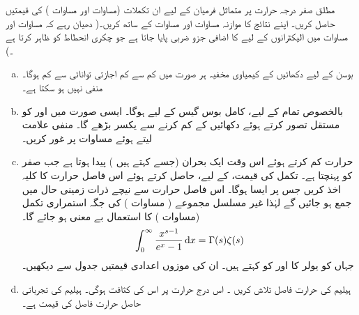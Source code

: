 مطلق صفر درجہ حرارت پر متماثل فرميان کے لیے   ان تکملات (مساوات    اور مساوات  )   کی قیمتیں حاصل کریں۔  اپنے نتائج کا موازنہ مساوات    اور مساوات     کے ساتھ کریں۔( دھیان رہے کہ مساوات     اور مساوات  میں الیکٹرانوں کے لیے  کا  اضافی جزو ضربی  پایا جاتا ہے جو چکری  انحطاط کو ظاہر کرتا ہے ۔)
\begin{enumerate}[a.]
\item
بوسن کے لیے دکھائیں کے کیمیاوی مخفیہ ہر صورت میں کم سے کم اجازتی توانائی سے کم ہوگا۔    منفی نہیں ہو سکتا ہے۔ 
\item
بالخصوص تمام  کے لیے،  کامل بوس گیس کے لیے  ہوگا۔  ایسی صورت میں  اور  کو مستقل تصور کرتے ہوئے دکھائیں کے  کم کرنے سے  یکسر بڑھے گا۔   منفی علامت لیتے ہوئے مساوات     پر غور کریں۔
\item
حرارت  کم کرتے ہوئے اس وقت ایک بحران (جسے    کہتے ہیں )  پیدا ہوتا ہے  جب  صفر کو پہنچتا ہے۔ تکمل کی قیمت،   کے لیے،  حاصل کرتے ہوئے اس فاصل حرارت   کا کلیہ اخذ کریں جس پر ایسا ہوگا۔  اس فاصل حرارت سے نیچے ذرات زمینی حال میں جمع ہو جائیں گے لہٰذا غیر مسلسل مجموعے (  مساوات  )   کی جگہ استمراری تکمل (مساوات  )   کا استعمال بے معنی ہو جائے گا۔  
\begin{align} 
\int_0^{\infty} \frac{x^{s - 1}}{e^x - 1} \dif x = \Gamma (s) \zeta(s)
\end{align} 
جہاں  کو  یولر  کا   اور  کو    کہتے ہیں۔ ان کی موزوں  اعدادی قیمتیں  جدول سے دیکھیں۔ 
\item
ہیلیم   کی حرارت فاصل تلاش کریں ۔ اس درج حرارت پر اس کی کثافت  ہوگی۔  ہیلیم کی تجرباتی حاصل حرارت فاصل کی قیمت  ہے۔ 
\end{enumerate}

